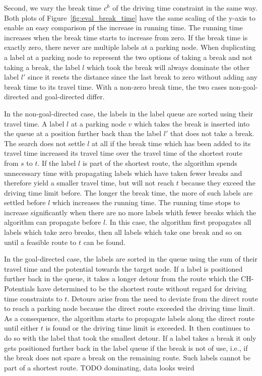 Second, we vary the break time $c^b$ of the driving time constraint in the same way. Both plots of Figure~\ref{fig:eval_break_time} have the same scaling of the y-axis to enable an easy comparison pf the increase in running time. The running time increases when the break time starts to increase from zero. If the break time is exactly zero, there never are multiple labels at a parking node. When duplicating a label at a parking node to represent the two options of taking a break and not taking a break, the label $l$ which took the break will always dominate the other label $l'$ since it resets the distance since the last break to zero without adding any break time to its travel time. With a non-zero break time, the two cases non-goal-directed and goal-directed differ.

In the non-goal-directed case, the labels in the label queue are sorted using their travel time. A label $l$ at a parking node $v$ which takes the break is inserted into the queue at a position further back than the label $l'$ that does not take a break. The search does not settle $l$ at all if the break time which has been added to its travel time increased its travel time over the travel time of the shortest route from $s$ to $t$. If the label $l$ is part of the shortest route, the algorithm spends unnecessary time with propagating labels which have taken fewer breaks and therefore yield a smaller travel time, but will not reach $t$ because they exceed the driving time limit before. The longer the break time, the more of such labels are settled before $l$ which increases the running time. The running time stops to increase significantly when there are no more labels whith fewer breaks which the algorithm can propagate before $l$. In this case, the algorithm first propagates all labels which take zero breaks, then all labels which take one break and so on until a feasible route to $t$ can be found.

In the goal-directed case, the labels are sorted in the queue using the sum of their travel time and the potential towards the target node. If a label is positioned further back in the queue, it takes a longer detour from the route which the CH-Potentials have determined to be the shortest route without regard for driving time constraints to $t$. Detours arise from the need to deviate from the direct route to reach a parking node because the direct route exceeded the driving time limit. As a consequence, the algorithm starts to propagate labels along the direct route until either $t$ is found or the driving time limit is exceeded. It then continues to do so with the label that took the smallest detour. If a label takes a break it only gets positioned further back in the label queue if the break is not of use, i.e., if the break does not spare a break on the remaining route. Such labels cannot be part of a shortest route. TODO dominating, data looks weird

